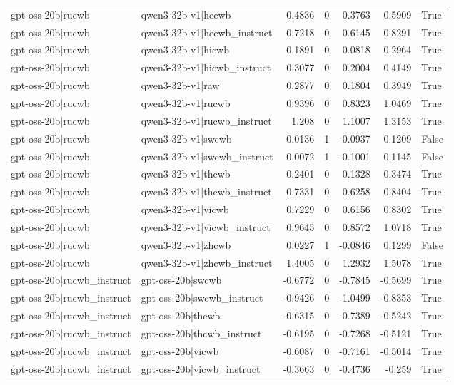 \begin{table}
\begin{tabular}{l l r r r r l}
gpt-oss-20b|rucwb & qwen3-32b-v1|hecwb & 0.4836 & 0 & 0.3763 & 0.5909 & True \\
gpt-oss-20b|rucwb & qwen3-32b-v1|hecwb_instruct & 0.7218 & 0 & 0.6145 & 0.8291 & True \\
gpt-oss-20b|rucwb & qwen3-32b-v1|hicwb & 0.1891 & 0 & 0.0818 & 0.2964 & True \\
gpt-oss-20b|rucwb & qwen3-32b-v1|hicwb_instruct & 0.3077 & 0 & 0.2004 & 0.4149 & True \\
gpt-oss-20b|rucwb & qwen3-32b-v1|raw & 0.2877 & 0 & 0.1804 & 0.3949 & True \\
gpt-oss-20b|rucwb & qwen3-32b-v1|rucwb & 0.9396 & 0 & 0.8323 & 1.0469 & True \\
gpt-oss-20b|rucwb & qwen3-32b-v1|rucwb_instruct & 1.208 & 0 & 1.1007 & 1.3153 & True \\
gpt-oss-20b|rucwb & qwen3-32b-v1|swcwb & 0.0136 & 1 & -0.0937 & 0.1209 & False \\
gpt-oss-20b|rucwb & qwen3-32b-v1|swcwb_instruct & 0.0072 & 1 & -0.1001 & 0.1145 & False \\
gpt-oss-20b|rucwb & qwen3-32b-v1|thcwb & 0.2401 & 0 & 0.1328 & 0.3474 & True \\
gpt-oss-20b|rucwb & qwen3-32b-v1|thcwb_instruct & 0.7331 & 0 & 0.6258 & 0.8404 & True \\
gpt-oss-20b|rucwb & qwen3-32b-v1|vicwb & 0.7229 & 0 & 0.6156 & 0.8302 & True \\
gpt-oss-20b|rucwb & qwen3-32b-v1|vicwb_instruct & 0.9645 & 0 & 0.8572 & 1.0718 & True \\
gpt-oss-20b|rucwb & qwen3-32b-v1|zhcwb & 0.0227 & 1 & -0.0846 & 0.1299 & False \\
gpt-oss-20b|rucwb & qwen3-32b-v1|zhcwb_instruct & 1.4005 & 0 & 1.2932 & 1.5078 & True \\
gpt-oss-20b|rucwb_instruct & gpt-oss-20b|swcwb & -0.6772 & 0 & -0.7845 & -0.5699 & True \\
gpt-oss-20b|rucwb_instruct & gpt-oss-20b|swcwb_instruct & -0.9426 & 0 & -1.0499 & -0.8353 & True \\
gpt-oss-20b|rucwb_instruct & gpt-oss-20b|thcwb & -0.6315 & 0 & -0.7389 & -0.5242 & True \\
gpt-oss-20b|rucwb_instruct & gpt-oss-20b|thcwb_instruct & -0.6195 & 0 & -0.7268 & -0.5121 & True \\
gpt-oss-20b|rucwb_instruct & gpt-oss-20b|vicwb & -0.6087 & 0 & -0.7161 & -0.5014 & True \\
gpt-oss-20b|rucwb_instruct & gpt-oss-20b|vicwb_instruct & -0.3663 & 0 & -0.4736 & -0.259 & True \\

\end{tabular}
\end{table}
